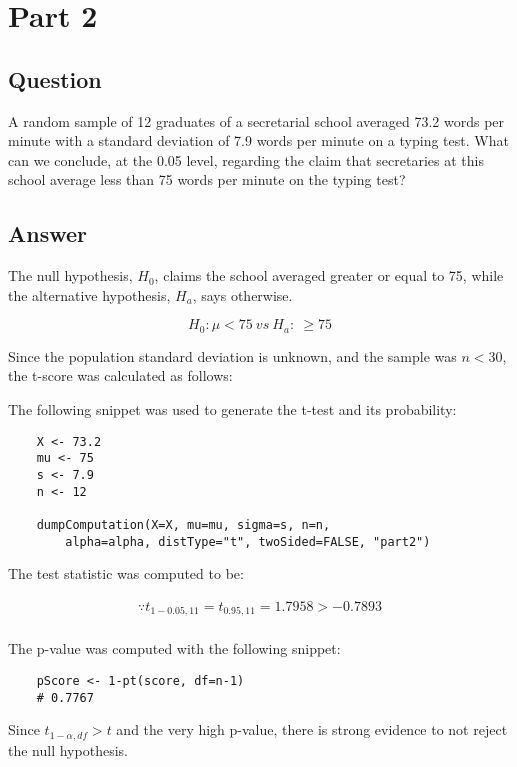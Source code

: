 \section{Part 2}
    \subsection{Question}
    A random sample of 12 graduates of a secretarial school averaged 73.2 words per minute with a standard deviation of 7.9 words per minute on a typing test. What can we conclude, at the 0.05 level, regarding the claim that secretaries at this school average less than 75 words per minute on the typing test?

    \subsection{Answer}
    The null hypothesis, $H_{0}$, claims the school averaged greater or equal to 75, while the alternative hypothesis, $H_{a}$, says otherwise.

        \[ H_{0}: \mu < 75 \ vs \ H_{a}: \ \geq 75 \]

    Since the population standard deviation is unknown, and the sample was $n < 30$, the t-score was calculated as follows:

        

    The following snippet was used to generate the t-test and its probability:
\begin{lstlisting}
    X <- 73.2
    mu <- 75
    s <- 7.9
    n <- 12

    dumpComputation(X=X, mu=mu, sigma=s, n=n, 
        alpha=alpha, distType="t", twoSided=FALSE, "part2")
\end{lstlisting}

    The test statistic was computed to be:

        \begin{align*}
            \because t_{1-0.05,11}=t_{0.95,11}=1.7958 > -0.7893\\
        \end{align*}

    The p-value was computed with the following snippet:
\begin{lstlisting}
    pScore <- 1-pt(score, df=n-1)
    # 0.7767
\end{lstlisting}

    Since $t_{1-\alpha, df} > t$ and the very high p-value, there is strong evidence to not reject the null hypothesis.
